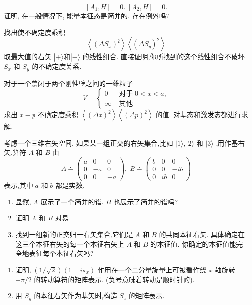 \begin{problemset}
	$$
	\left\lbrack {{A}_{1}, H}\right\rbrack = 0.\;\left\lbrack {{A}_{2}, H}\right\rbrack = 0.
	$$
	证明, 在一般情况下, 能量本征态是简并的. 存在例外吗? 
	\item 找出使不确定度乘积
	$$
	\left\langle {\left( \Delta {S}_{x}\right) }^{2}\right\rangle \left\langle {\left( \Delta {S}_{y}\right) }^{2}\right\rangle 
	$$
	取最大值的右矢 $\left| {+\rangle \text{和}}\right| - \rangle$ 的线性组合. 直接证明,你所找到的这个线性组合不破坏 ${S}_{x}$ 和 ${S}_{y}$ 的不确定度关系.
	\item 对于一个禁闭于两个刚性壁之间的一维粒子,
	$$
	V = \left\{ \begin{array}{ll} 0 & \text{ 对于 }0 < x < a, \\ \infty & \text{ 其他 } \end{array}\right.
	$$
	求出 $x - p$ 不确定度乘积 $\left\langle {\left( \Delta x\right) }^{2}\right\rangle \left\langle {\left( \Delta p\right) }^{2}\right\rangle$ 的值. 对基态和激发态都进行求解.
	\item 考虑一个三维右矢空间. 如果某一组正交的右矢集合,比如 $\left| {1\rangle ,}\right| 2\rangle$ 和 $|3\rangle$ ,用作基右矢,算符 $A$ 和 $B$ 由
	$$
	A \doteq \left( \begin{matrix} a & 0 & 0 \\ 0 & - a & 0 \\ 0 & 0 & - a \end{matrix}\right) ,\;B \doteq \left( \begin{matrix} b & 0 & 0 \\ 0 & 0 & - {ib} \\ 0 & {ib} & 0 \end{matrix}\right)
	$$
	表示,其中 $a$ 和 $b$ 都是实数.
	\begin{enumerate}
		\item 显然, $A$ 展示了一个简并的谱. $B$ 也展示了简并的谱吗?
		\item 证明 $A$ 和 $B$ 对易.
		\item 找到一组新的正交归一右矢集合,它们是 $A$ 和 $B$ 的共同本征右矢. 具体确定在这三个本征右矢的每一个本征右矢上 $A$ 和 $B$ 的本征值. 你确定的本征值能完全地表征每个本征右矢吗?
	\end{enumerate}
	\item 
	\begin{enumerate}
		\item 证明, $\left( {1/\sqrt{2}}\right) \left( {1 + i{\sigma }_{x}}\right)$ 作用在一个二分量旋量上可被看作绕 $x$ 轴旋转 $- \pi /2$ 的转动算符的矩阵表示. (负号意味着转动是顺时针的).
		\item 用 ${S}_{y}$ 的本征右矢作为基矢时,构造 ${S}_{z}$ 的矩阵表示.

\end{enumerate}
\end{problemset}
